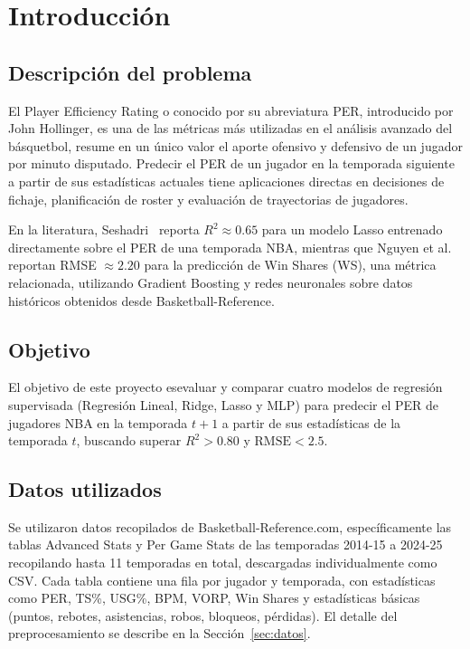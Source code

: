 \documentclass[11pt,a4paper]{article}
\begin{document}
\section{Introducción}

\subsection{Descripción del problema}

El Player Efficiency Rating o conocido por su abreviatura PER, introducido por John Hollinger,
es una de las métricas más utilizadas en el análisis avanzado del
básquetbol, resume en un único valor el aporte ofensivo y defensivo de un
jugador por minuto disputado. Predecir el PER de un jugador en la temporada
siguiente a partir de sus estadísticas actuales tiene aplicaciones directas
en decisiones de fichaje, planificación de roster y evaluación de
trayectorias de jugadores.

En la literatura, Seshadri~\cite{seshadri2024} reporta $R^2 \approx 0.65$
para un modelo Lasso entrenado directamente sobre el PER de una temporada
NBA, mientras que Nguyen et al.~\cite{nguyen2022} reportan RMSE $\approx 2.20$
para la predicción de Win Shares (WS), una métrica relacionada,
utilizando Gradient Boosting y redes neuronales sobre datos históricos obtenidos desde
Basketball-Reference.

\subsection{Objetivo}

El objetivo de este proyecto esevaluar y comparar cuatro modelos de
regresión supervisada (Regresión Lineal, Ridge, Lasso y MLP) para predecir
el PER de jugadores NBA en la temporada $t+1$ a partir de sus estadísticas
de la temporada $t$, buscando superar $R^2 > 0.80$ y $\text{RMSE} < 2.5$.


\subsection{Datos utilizados}

Se utilizaron datos recopilados de Basketball-Reference.com, específicamente las tablas
Advanced Stats y Per Game Stats de las temporadas
2014-15 a 2024-25 recopilando hasta 11 temporadas en total, descargadas individualmente como CSV.
Cada tabla contiene una fila por jugador y temporada, con estadísticas como
PER, TS\%, USG\%, BPM, VORP, Win Shares y estadísticas básicas (puntos,
rebotes, asistencias, robos, bloqueos, pérdidas). El detalle del
preprocesamiento se describe en la Sección~\ref{sec:datos}.
\end{document}
